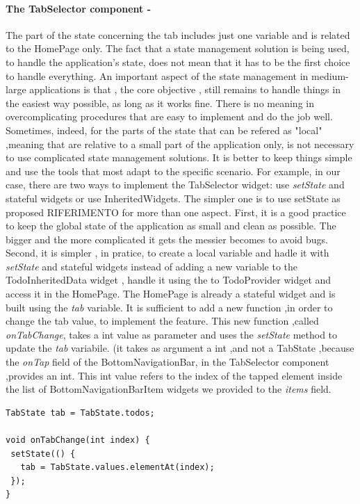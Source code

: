 \paragraph{The TabSelector component - }
\label{subpar:todo_app_inherited_widget_tabselector_component}
The part of the state concerning the tab includes just one variable and is related to the HomePage only. The fact that a state management solution is being used, to handle the application's state, does not mean that it has to be the first choice to handle everything. An important aspect of the state management in medium-large applications is that , the core objective , still remains to handle things in the easiest way possible, as long as it works fine. There is no meaning in overcomplicating procedures that are easy to implement and do the job well. Sometimes, indeed, for the parts of the state that can be refered as "local" ,meaning that are relative to a small part of the application only, is not necessary to use complicated state management solutions. It is better to keep things simple and use the tools that most adapt to the specific scenario.
For example, in our case, there are two ways to implement the TabSelector widget: use \textit{setState} and stateful widgets or use InheritedWidgets. The simpler one is to use setState as proposed RIFERIMENTO for more than one aspect. First, it is a good practice to keep the global state of the application as small and clean as possible. The bigger and the more complicated it gets the messier becomes to avoid bugs. Second, it is simpler , in pratice, to create a local variable and hadle it with \textit{setState} and stateful widgets instead of adding a new variable to the TodoInheritedData widget , handle it using the to TodoProvider widget and  access it in the HomePage. The HomePage is already a stateful widget and is built using the \textit{tab }variable. It is sufficient to add a new function ,in order to change the tab value, to implement the feature. This new function ,called \textit{onTabChange}, takes a int value as parameter and uses the \textit{setState} method to update the \textit{tab} variabile. (it takes as argument a int ,and not a TabState ,because the \textit{onTap} field of the BottomNavigationBar, in the TabSelector component ,provides an int. This int value refers to the index of the tapped element inside the list of BottomNavigationBarItem widgets we provided to the \textit{items} field.
\mbox{}\\
\begin{code}
\mbox{}
\label{code:2.30}
\begin{verbatim}
TabState tab = TabState.todos;

void onTabChange(int index) {
 setState(() {
   tab = TabState.values.elementAt(index);
 });
}
\end{verbatim}
\end{code}
